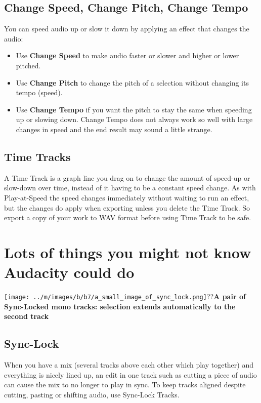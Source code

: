\documentclass[twocolumn]{book}
\begin{document}
\subsection{Change Speed, Change Pitch, Change Tempo}


You can speed audio up or slow it down by applying an effect that changes the audio:  
\begin{itemize}
\item  Use \textbf{Change Speed} to make audio faster or slower and higher or lower pitched. 
\item  Use \textbf{Change Pitch} to change the pitch of a selection without changing its tempo (speed). 
\item  Use \textbf{Change Tempo} if you want the pitch to stay the same when speeding up or slowing down. Change Tempo does not always work so well with large changes in speed and the end result may sound a little strange.
\end{itemize}

\subsection{Time Tracks}


A Time Track is a graph line you drag on to change the amount of speed-up or slow-down over time, instead of it having to be a constant speed change. As with Play-at-Speed the speed changes immediately without waiting to run an effect, but the changes do apply when exporting unless you delete the Time Track. So export a copy of your work to WAV format before using Time Track to be safe. 



\section{Lots of things you might not know Audacity could do}

\texttt{[image: ../m/images/b/b7/a\_small\_image\_of\_sync\_lock.png]}??\textbf{A pair of Sync-Locked mono tracks: selection extends automatically to the second track}

\subsection{Sync-Lock}


When you have a mix (several tracks above each other which play together) and everything is nicely lined up, an edit in one track such as cutting a piece of audio can cause the mix to no longer to play in sync. To keep tracks aligned despite cutting, pasting or shifting audio, use Sync-Lock Tracks.
\end{document}

